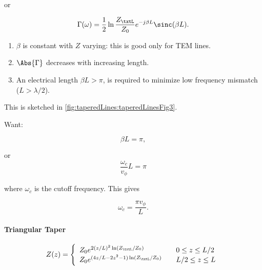 or

\begin{equation}\label{eqn:continuumAndOtherTransformersCore:940}
\Gamma(\omega) = \frac{1}{2} \ln \frac{Z_\txtL}{Z_0} e^{-j \beta L} \sinc( \beta L ).
\end{equation}

\begin{enumerate}
\item \( \beta \) is constant with \( Z \) varying: this is good only for TEM lines.
\item \( \Abs{\Gamma} \) decreases with increasing length.
\item An electrical length \( \beta L > \pi \), is required to minimize low frequency mismatch (\( L > \lambda/2\)).
\end{enumerate}

This is sketched in \cref{fig:taperedLines:taperedLinesFig3}.


Want:

\begin{equation}\label{eqn:continuumAndOtherTransformersCore:760}
\beta L = \pi,
\end{equation}

or
\begin{equation}\label{eqn:continuumAndOtherTransformersCore:780}
\frac{\omega_c}{v_\phi} L = \pi
\end{equation}

where \( \omega_c \) is the cutoff frequency.  This gives

\begin{equation}\label{eqn:continuumAndOtherTransformersCore:800}
\omega_c = \frac{\pi v_\phi}{L}.
\end{equation}

\paragraph{Triangular Taper}

\begin{equation}\label{eqn:continuumAndOtherTransformersCore:960}
Z(z) =
\left\{
\begin{array}{l l}
Z_0 e^{2(z/L)^2 \ln(Z_\txtL/Z_0)} & \quad \mbox{\( 0 \le z \le L/2\)} \\
Z_0 e^{(4z/L - 2 z^2 - 1) \ln(Z_\txtL/Z_0)} & \quad \mbox{\( L/2 \le z \le L\)} \\
\end{array}
\right.
\end{equation}

